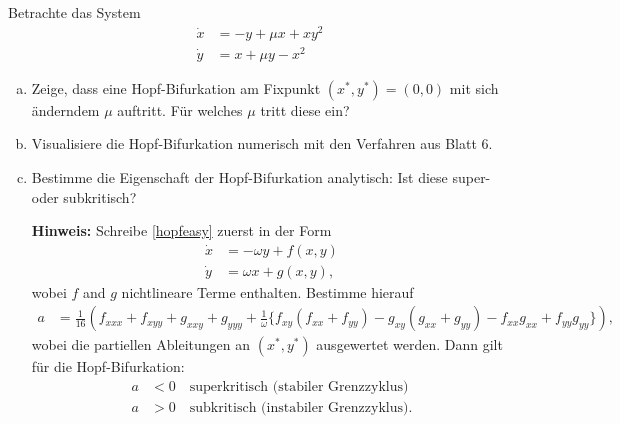 \documentclass[11pt,a4paper]{article}
\begin{document}



\begin{aufg}
Betrachte das System
\begin{equation} \label{hopfeasy} 
\begin{aligned}
  \dot{x} &= -y + \mu x + xy^2\\
  \dot{y} &= x + \mu y - x^2
\end{aligned}
\end{equation}
\begin{enumerate}[a)]
\item Zeige, dass eine Hopf-Bifurkation am Fixpunkt $(x^*,y^*) = (0,0)$ mit sich \"anderndem $\mu$ auftritt. F\"ur welches $\mu$ tritt diese ein?
\item Visualisiere die Hopf-Bifurkation numerisch mit den Verfahren aus Blatt 6. 
\item Bestimme die Eigenschaft der Hopf-Bifurkation analytisch: Ist diese super- oder subkritisch? 

\smallskip
\footnotesize{
\textbf{Hinweis: } Schreibe \eqref{hopfeasy} zuerst in der Form \begin{align*} \dot{x} &= -\omega y + f(x,y) \\ \dot{y} &= \omega x + g(x,y), \end{align*} wobei $f$ and $g$ nichtlineare Terme enthalten. Bestimme hierauf \begin{align*} a &= \frac{1}{16}\left(f_{xxx} + f_{xyy} + g_{xxy} + g_{yyy} + \frac{1}{\omega}\{f_{xy}(f_{xx}+f_{yy}) - g_{xy}(g_{xx}+g_{yy}) - f_{xx}g_{xx} + f_{yy}g_{yy}\}\right),\end{align*} wobei die partiellen Ableitungen an $(x^*,y^*)$ ausgewertet werden. Dann gilt f\"ur die Hopf-Bifurkation:\begin{align*}  a &< 0 \quad \text{superkritisch (stabiler Grenzzyklus)} \\ a &> 0 \quad \text{subkritisch (instabiler Grenzzyklus)}.\end{align*} }
\end{enumerate}
\end{aufg}

\bigskip%
\end{document}
